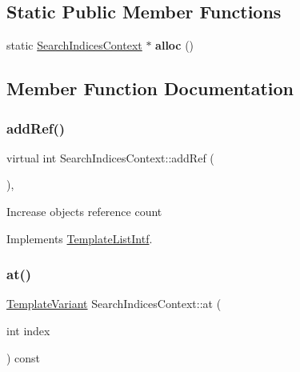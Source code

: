 \subsection*{Static Public Member Functions}
\begin{DoxyCompactItemize}
\item 
\mbox{\label{class_search_indices_context_a53fb0a06c97c388aabf250d46a121b9f}} 
static \mbox{\hyperlink{class_search_indices_context}{Search\+Indices\+Context}} $\ast$ {\bfseries alloc} ()
\end{DoxyCompactItemize}


\subsection{Member Function Documentation}
\mbox{\label{class_search_indices_context_ac6351cde31163d5a7e94bd43ea795673}} 
\subsubsection{\texorpdfstring{addRef()}{addRef()}}
{\footnotesize\ttfamily virtual int Search\+Indices\+Context\+::add\+Ref (\begin{DoxyParamCaption}{ }\end{DoxyParamCaption})\hspace{0.3cm}{\ttfamily [inline]}, {\ttfamily [virtual]}}

Increase object\textquotesingle{}s reference count 

Implements \mbox{\hyperlink{class_template_list_intf_a4b4973e2e15396d10bc4e3085462ca2b}{Template\+List\+Intf}}.

\mbox{\label{class_search_indices_context_a01954b6da883d9274840295905a999c8}} 
\subsubsection{\texorpdfstring{at()}{at()}}
{\footnotesize\ttfamily \mbox{\hyperlink{class_template_variant}{Template\+Variant}} Search\+Indices\+Context\+::at (\begin{DoxyParamCaption}\item[{int}]{index }\end{DoxyParamCaption}) const\hspace{0.3cm}{\ttfamily [virtual]}}

